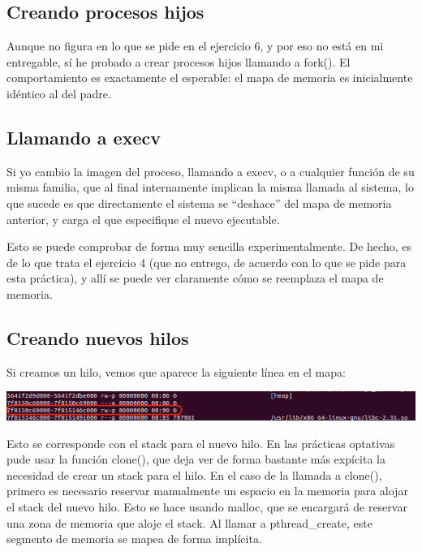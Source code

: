\documentclass[a4paper]{article}
\begin{document}
\subsection{Creando procesos hijos}

Aunque no figura en lo que se pide en el ejercicio 6, y por eso no está en mi entregable, sí he probado a crear procesos hijos llamando a {\ttfamily fork()}. El comportamiento es exactamente el esperable: el mapa de memoria es inicialmente idéntico al del padre.

\subsection{Llamando a {\ttfamily execv}}

Si yo cambio la imagen del proceso, llamando a {\ttfamily execv}, o a cualquier función de su misma familia, que al final internamente implican la misma llamada al sistema, lo que sucede es que directamente el sistema se ``deshace'' del mapa de memoria anterior, y carga el que especifique el nuevo ejecutable.

Esto se puede comprobar de forma muy sencilla experimentalmente. De hecho, es de lo que trata el ejercicio 4 (que no entrego, de acuerdo con lo que se pide para esta práctica), y allí se puede ver claramente cómo se reemplaza el mapa de memoria.

\subsection{Creando nuevos hilos}

Si creamos un hilo, vemos que aparece la siguiente línea en el mapa:

\includegraphics[scale=0.447]{6_hijo1.png}

Esto se corresponde con el stack para el nuevo hilo. En las prácticas optativas pude usar la función {\ttfamily clone()}, que deja ver de forma bastante más expícita la necesidad de crear un stack para el hilo. En el caso de la llamada a {\ttfamily clone()}, primero es necesario reservar manualmente un espacio en la memoria para alojar el stack del nuevo hilo. Esto se hace usando {\ttfamily malloc}, que se encargará de reservar una zona de memoria que aloje el stack. Al llamar a {\ttfamily pthread\_create}, este segmento de memoria se mapea de forma implícita.
\end{document}

